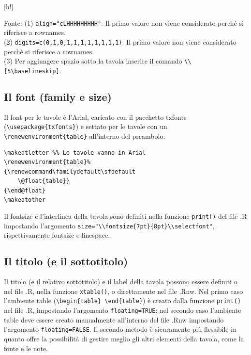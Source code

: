 \documentclass[a4paper, 12pt]{article}\usepackage[]{graphicx}\usepackage[]{color}
\makeatletter
\renewenvironment{table}%
{\renewcommand\familydefault\sfdefault
	\@float{table}}
{\end@float}
\makeatother
\begin{document}
\begin{table}[h!]
\begin{centering}
  \end{centering}
  {\scriptsize 
    Fonte: \lipsum[1]
    (1) \verb|align="cLHHHHHHHHH"|. Il primo valore non viene considerato perché si riferisce a rownames.\\
    (2) \verb|digits=c(0,1,0,1,1,1,1,1,1,1,1)|. Il primo valore non viene considerato perché si riferisce a rownames.\\
    (3) Per aggiungere spazio sotto la tavola inserire il comando \verb|\\[5\baselineskip]|.
  }
  \\[1\baselineskip]
\end{table}


\subsection{Il font (family e size)} 
\label{sec:font}
Il font per le tavole è l'Arial, caricato con il pacchetto txfonts (\verb|\usepackage{txfonts}|) e settato per le tavole con un \verb|\renewenvironment{table}| all'interno del preambolo:
\begin{verbatim}
\makeatletter %% Le tavole vanno in Arial
\renewenvironment{table}%
{\renewcommand\familydefault\sfdefault
	\@float{table}}
{\end@float}
\makeatother
\end{verbatim}

Il fontsize e l'interlinea della tavola sono definiti nella funzione \verb|print()| del file .R impostando l'argomento \verb|size="\\fontsize{7pt}{8pt}\\selectfont"|, rispettivamente fontsize e linespace.

\subsection{Il titolo (e il sottotitolo)} 
\label{sec:titolo}


Il titolo (e il relativo sottotitolo) e il label della tavola possono essere definiti o nel file .R, nella funzione \verb|xtable()|, o direttamente nel file .Rnw. Nel primo caso l'ambiente table (\verb|\begin{table} \end{table}|) è creato dalla funzione \verb|print()| nel file .R, impostando l'argomento \verb|floating=TRUE|; nel secondo caso l'ambiente table deve essere creato manualmente all'interno del file .Rnw impostando l'argomento \verb|floating=FALSE|. Il secondo metodo è sicuramente più flessibile in quanto offre la possibilità di gestire meglio gli altri elementi della tavola, come la fonte e le note.
\end{document}
